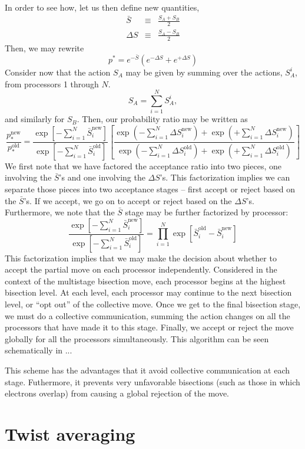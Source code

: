 \documentclass{article}
\begin{document}
In order to see how, let us then define new quantities,
\begin{eqnarray}
\bar{S} & \equiv & \frac{S_A + S_B}{2} \\
\Delta S & \equiv & \frac{S_A - S_B}{2} 
\end{eqnarray}
Then, we may rewrite
\begin{equation}
p^* = e^{-\bar{S}}\left(e^{-\Delta S} + e^{+\Delta S} \right)
\end{equation}
Consider now that the action $S_A$ may be given by summing over the
actions, $S_A^i$, from processors 1 through $N$.  
\begin{equation}
S_A = \sum_{i=1}^N S_A^i,
\end{equation}
and similarly for $S_B$.  Then, our probability ratio may be written
as
\begin{equation}
\frac{p_*^\text{new}}{p_*^\text{old}} = 
\frac{\exp \left[-\sum_{i=1}^{N} \bar{S}^\text{new}_i \right]}
{\exp \left[-\sum_{i=1}^{N} \bar{S}^\text{old}_i \right]}
\left[
\frac{\exp \left(-\sum_{i=1}^N \Delta S_i^\text{new} \right) +
\exp \left(+\sum_{i=1}^N \Delta S_i^\text{new} \right)}
{\exp \left(-\sum_{i=1}^N \Delta S_i^\text{old} \right)+
\exp \left(+\sum_{i=1}^N \Delta S_i^\text{old} \right)} \right]
\end{equation}
We first note that we have factored the acceptance ratio into two
pieces, one involving the $\bar{S}$'s and one involving the $\Delta
S$'s. This factorization implies we can separate those pieces into two
acceptance stages -- first accept or reject based on the $\bar{S}$'s.
If we accept, we go on to accept or reject based on the $\Delta S$'s.
Furthermore, we note that the $\bar{S}$ stage may be further
factorized by processor:
\begin{equation}
\frac{\exp \left[-\sum_{i=1}^{N} \bar{S}^\text{new}_i \right]}
{\exp \left[-\sum_{i=1}^{N} \bar{S}^\text{old}_i \right]} =
\prod_{i=1}^N \exp \left[ \bar{S}_i^\text{old} - \bar{S}_i^\text{new}\right]
\end{equation}
This factorization implies that we may make the decision about whether
to accept the partial move on each processor independently.
Considered in the context of the multistage bisection move, each
processor begins at the highest bisection level.  At each level, each
processor may continue to the next bisection level, or ``opt out'' of
the collective move.  Once we get to the final bisection stage, we
must do a collective communication, summing the action changes on all
the processors that have made it to this stage.  Finally, we accept or
reject the move globally for all the processors simultaneously.  This
algorithm can be seen schematically in ...

This scheme has the advantages that it avoid collective communication
at each stage.  Futhermore, it prevents very unfavorable bisections
(such as those in which electrons overlap) from causing a global
rejection of the move.




\section{Twist averaging}
\end{document}
